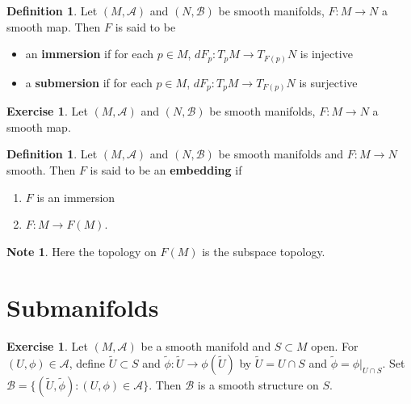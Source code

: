 \documentclass{book}
\theoremstyle{definition}
\newtheorem{defn}[definition]{Definition}
\newtheorem{note}[definition]{Note}
\newtheorem{ex}[definition]{Exercise}
\newcommand{\MA}{\mathcal{A}}
\newcommand{\MB}{\mathcal{B}}
\DeclareMathOperator*{\0}{\mbf{0}}
\DeclareMathOperator*{\1}{\mbf{1}}
\begin{document}
	\begin{defn}
		Let $(M, \MA)$ and $(N, \MB)$ be smooth manifolds, $F: M \rightarrow N$ a smooth map. Then $F$ is said to be 
		\begin{itemize}
		
			\item an \textbf{immersion} if for each $p \in M$, $dF_p:T_pM\rightarrow T_{F(p)}N$ is injective
			\item a \textbf{submersion} if for each $p \in M$, $dF_p:T_pM\rightarrow T_{F(p)}N$ is surjective
		\end{itemize}
	\end{defn}
	
	\begin{ex}
	Let $(M, \MA)$ and $(N, \MB)$ be smooth manifolds, $F: M \rightarrow N$ a smooth map. 
	\end{ex}
	
	\begin{defn}
	Let $(M, \MA)$ and $(N, \MB)$ be smooth manifolds and $F:M \rightarrow N$ smooth. Then $F$ is said to be an \textbf{embedding} if 
	\begin{enumerate}
	\item $F$ is an immersion
	\item $F:M \rightarrow F(M)$. 
\end{enumerate}	 
	\end{defn}	

	\begin{note}
	Here the topology on $F(M)$ is the subspace topology.
	\end{note}
	

	
	
	
	
	
	
	
	
	
	
	\newpage
	\section{Submanifolds}
	
	
	\begin{ex}
	Let $(M, \MA)$ be a smooth manifold and $S \subset M$ open. For $(U, \phi) \in \MA$, define $\tilde{U} \subset S$ and $\tilde{\phi}: \tilde{U} \rightarrow \phi(\tilde{U})$ by $\tilde{U} = U \cap S$ and $\tilde{\phi} = \phi|_{U \cap S}$. Set $\MB = \{(\tilde{U}, \tilde{\phi}): (U, \phi) \in \MA\}$.
	Then $\MB$ is a smooth structure on $S$.
	\end{ex}
	
\end{document}
